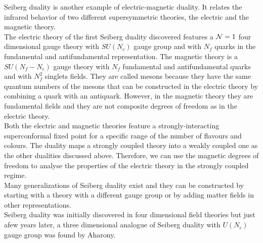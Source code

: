 Seiberg duality is another example of electric-magnetic duality.
It relates the infrared behavior of two different supersymmetric theories, the electric and the magnetic theory.\\
The electric theory of the first Seiberg duality discovered features a $\mathcal{N}=1$ four dimensional gauge theory with $SU(N_c)$ gauge group and with $N_f$ quarks in the fundamental and antifundamental representation.
The magnetic theory is a $SU(N_f-N_c)$ gauge theory with $N_f$ fundamental and antifundamental quarks and with $N_f^2$ singlets fields. 
They are called mesons because they have the same quantum numbers of the mesons that can be constructed in the electric theory by combining a quark with an antiquark. 
However, in the magnetic theory they are fundamental fields and they are not composite degrees of freedom as in the electric theory.\\
Both the electric and magnetic theories feature a strongly-interacting superconformal fixed point for a specific range of the number of flavours and colours. 
The duality maps a strongly coupled theory into a weakly coupled one as the other dualities discussed above. 
Therefore, we can use the magnetic degrees of freedom to analyse the properties of the electric theory in the strongly coupled regime.\\
Many generalizations of Seiberg duality exist and they can be constructed by starting with a theory with a different gauge group or by adding matter fields in other representations.
\\
Seiberg duality was initially discovered in four dimensional field theories but just afew years later, a three dimensional analogue of Seiberg duality with $U(N_c)$ gauge group was found by Aharony.\\


